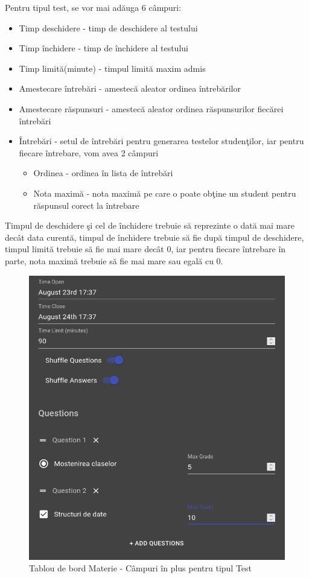 \documentclass[12pt, a4paper, oneside, romanian]{teza-upb}
\begin{document}
Pentru tipul test, se vor mai adăuga 6 câmpuri:
\begin{itemize}
	\item Timp deschidere - timp de deschidere al testului
	\item Timp închidere - timp de închidere al testului
	\item Timp limită(minute) - timpul limită maxim admis
	\item Amestecare întrebări - amestecă aleator ordinea întrebărilor
	\item Amestecare răspunsuri - amestecă aleator ordinea răspunsurilor fiecărei întrebări
	\item Întrebări - setul de întrebări pentru generarea testelor studenţilor, iar pentru fiecare întrebare, vom avea 2 câmpuri
		\begin{itemize}
			\item Ordinea - ordinea în lista de întrebări
			\item Nota maximă - nota maximă pe care o poate obţine un student pentru răspunsul corect la întrebare
		\end{itemize}
\end{itemize}
Timpul de deschidere şi cel de închidere trebuie să reprezinte o dată mai mare decât data curentă, timpul de închidere trebuie să fie după timpul de deschidere, timpul limită trebuie să fie mai mare decât 0, iar pentru fiecare întrebare în parte, nota maximă trebuie să fie mai mare sau egală cu 0.

\begin{figure}[H]
\centering
\includegraphics*[width=0.7\columnwidth]{tablou-de-bord-materie-campuri-test}
\caption{Tablou de bord Materie - Câmpuri în plus pentru tipul Test}
\label{tablou-de-bord-materie-campuri-test}
\end{figure}
\end{document}
